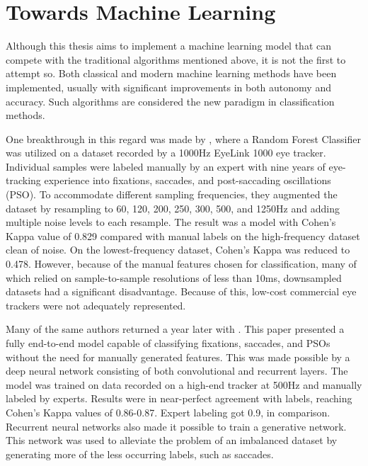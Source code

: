 \section{Towards Machine Learning} \label{sec:pw_TowardsMachineLearning}

Although this thesis aims to implement a machine learning model that can compete with the traditional algorithms mentioned above, it is not the first to attempt so. Both classical and modern machine learning methods have been implemented, usually with significant improvements in both autonomy and accuracy. Such algorithms are considered the new paradigm in classification methods.

One breakthrough in this regard was made by \cite{zemblys2017}, where a Random Forest Classifier was utilized on a dataset recorded by a 1000Hz EyeLink 1000 eye tracker. Individual samples were labeled manually by an expert with nine years of eye-tracking experience into fixations, saccades, and post-saccading oscillations (PSO). To accommodate different sampling frequencies, they augmented the dataset by resampling to 60, 120, 200, 250, 300, 500, and 1250Hz and adding multiple noise levels to each resample. The result was a model with Cohen's Kappa value of 0.829 compared with manual labels on the high-frequency dataset clean of noise. On the lowest-frequency dataset, Cohen's Kappa was reduced to 0.478. However, because of the manual features chosen for classification, many of which relied on sample-to-sample resolutions of less than 10ms, downsampled datasets had a significant disadvantage. Because of this, low-cost commercial eye trackers were not adequately represented.

Many of the same authors returned a year later with \cite{zemblys2018}. This paper presented a fully end-to-end model capable of classifying fixations, saccades, and PSOs without the need for manually generated features. This was made possible by a deep neural network consisting of both convolutional and recurrent layers. The model was trained on data recorded on a high-end tracker at 500Hz and manually labeled by experts. Results were in near-perfect agreement with labels, reaching Cohen's Kappa values of 0.86-0.87. Expert labeling got 0.9, in comparison. Recurrent neural networks also made it possible to train a generative network. This network was used to alleviate the problem of an imbalanced dataset by generating more of the less occurring labels, such as saccades.

